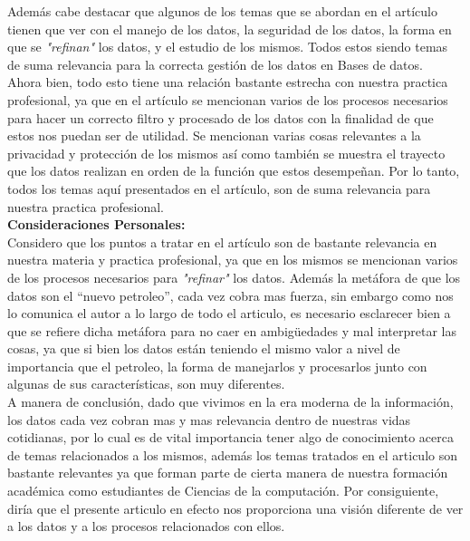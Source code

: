 Además cabe destacar que algunos de los temas que se abordan en el artículo tienen que ver con el manejo de los datos, la seguridad de los datos, la forma en que se \textit{"refinan"} los datos, y el estudio de los mismos. Todos estos siendo temas de suma relevancia para la correcta gestión de los datos en Bases de datos.\\

Ahora bien, todo esto tiene una relación bastante estrecha con nuestra practica profesional, ya que en el artículo se mencionan varios de los procesos necesarios para hacer un correcto filtro y procesado de los datos con la finalidad de que estos nos puedan ser de utilidad. Se mencionan varias cosas relevantes a la privacidad y protección de los mismos así como también se muestra el trayecto que los datos realizan en orden de la función que estos desempeñan. Por lo tanto, todos los temas aquí presentados en el artículo, son de suma relevancia para nuestra practica profesional.\\

\textbf{Consideraciones Personales:} \\

Considero que los puntos a tratar en el artículo son de bastante relevancia en nuestra materia y practica profesional, ya que en los mismos se mencionan varios de los procesos necesarios para \textit{"refinar"} los datos. Además la metáfora de que los datos son el “nuevo petroleo”, cada vez cobra mas fuerza, sin embargo como nos lo comunica el autor a lo largo de todo el articulo, es necesario esclarecer bien a que se refiere dicha metáfora para no caer en ambigüedades y mal interpretar las cosas, ya que si bien los datos están teniendo el mismo valor a nivel de importancia que el petroleo, la forma de manejarlos y procesarlos junto con algunas de sus características, son muy diferentes. \\

A manera de conclusión, dado que vivimos en la era moderna de la información, los datos cada vez cobran mas y mas relevancia dentro de nuestras vidas cotidianas, por lo cual es de vital importancia tener algo de conocimiento acerca de temas relacionados a los mismos, además los temas tratados en el articulo son bastante relevantes ya que forman parte de cierta manera de nuestra formación académica como estudiantes de Ciencias de la computación. Por consiguiente, diría que el presente articulo en efecto nos proporciona una visión diferente de ver a los datos y a los procesos relacionados con ellos.\\

